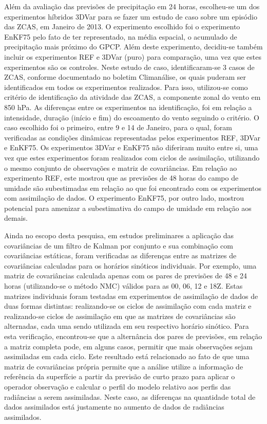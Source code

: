 Além da avaliação das previsões de precipitação em 24 horas, escolheu-se um dos experimentos híbridos 3DVar para se fazer um estudo de caso sobre um episódio das ZCAS, em Janeiro de 2013. O experimento escolhido foi o experimento EnKF75 pelo fato de ter representado, na média espacial, o acumulado de precipitação mais próximo do GPCP. Além deste experimento, decidiu-se também incluir os experimentos REF e 3DVar (puro) para comparação, uma vez que estes experimentos são os controles. Neste estudo de caso, identificaram-se 3 casos de ZCAS, conforme documentado no boletim Climanálise, os quais puderam ser identificados em todos os experimentos realizados. Para isso, utilizou-se como critério de identificação da atividade das ZCAS, a componente zonal do vento em 850 hPa. As diferenças entre os experimentos na identificação, foi em relação a intensidade, duração (início e fim) do escoamento do vento seguindo o critério. O caso escolhido foi o primeiro, entre 9 e 14 de Janeiro, para o qual, foram verificadas as condições dinâmicas representadas pelos experimentos REF, 3DVar e EnKF75. Os experimentos 3DVar e EnKF75 não diferiram muito entre si, uma vez que estes experimentos foram realizados com ciclos de assimilação, utilizando o mesmo conjunto de observações e matriz de covariâncias. Em relação ao experimento REF, este mostrou que as previsões de 48 horas do campo de umidade são subestimadas em relação ao que foi encontrado com os experimentos com assimilação de dados. O experimento EnKF75, por outro lado, mostrou potencial para amenizar a subestimativa do campo de umidade em relação aos demais.

Ainda no escopo desta pesquisa, em estudos preliminares a aplicação das covariâncias de um filtro de Kalman por conjunto e sua combinação com covariâncias estáticas, foram verificadas as diferenças entre as matrizes de covariâncias calculadas para os horários sinóticos individuais. Por exemplo, uma matriz de covariâncias calculada apenas com os pares de previsões de 48 e 24 horas (utilizando-se o método NMC) válidos para as 00, 06, 12 e 18Z. Estas matrizes individuais foram testadas em experimentos de assimilação de dados de duas formas distintas: realizando-se os ciclos de assimilação com cada matriz e realizando-se ciclos de assimilação em que as matrizes de covariâncias são alternadas, cada uma sendo utilizada em seu respectivo horário sinótico. Para esta verificação, encontrou-se que a alternância dos pares de previsões, em relação a matriz completa pode, em alguns casos, permitir que mais observações sejam assimiladas em cada ciclo. Este resultado está relacionado ao fato de que uma matriz de covariâncias própria permite que a análise utilize a informação de referência da superfície a partir da previsão de curto prazo para aplicar o operador observação e calcular o perfil do modelo relativo aos perfis das radiâncias a serem assimiladas. Neste caso, as diferenças na quantidade total de dados assimilados está justamente no aumento de dados de radiâncias assimilados. 


